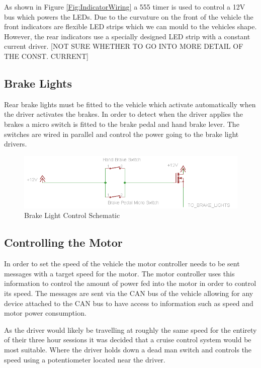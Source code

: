 \documentclass[10pt,a4paper]{article}
\begin{document}
As shown in Figure \ref{Fig:IndicatorWiring} a 555 timer is used to control a 12V bus which powers the LEDs. Due to the curvature on the front of the vehicle the front indicators are flexible LED strips which we can mould to the vehicles shape. However, the rear indicators use a specially designed LED strip with a constant current driver. [NOT SURE WHETHER TO GO INTO MORE DETAIL OF THE CONST. CURRENT]

\subsection{Brake Lights}

Rear brake lights must be fitted to the vehicle which activate automatically when the driver activates the brakes. In order to detect when the driver applies the brakes a micro switch is fitted to the brake pedal and hand brake lever. The switches are wired in parallel and control the power going to the brake light drivers. 

\begin{figure}[H]
\includegraphics[width=\columnwidth]{BrakeLightControl.png}%
\caption{Brake Light Control Schematic}
\label{Fig:BrakeLightsWiring}
\end{figure}

\subsection{Controlling the Motor}
In order to set the speed of the vehicle the motor controller needs to be sent messages with a target speed for the motor. The motor controller uses this information to control the amount of power fed into the motor in order to control its speed. The messages are sent via the CAN bus of the vehicle allowing for any device attached to the CAN bus to have access to information such as speed and motor power consumption. 

As the driver would likely be travelling at roughly the same speed for the entirety of their three hour sessions it was decided that a cruise control system would be most suitable. Where the driver holds down a dead man switch and controls the speed using a potentiometer located near the driver.
\end{document}
